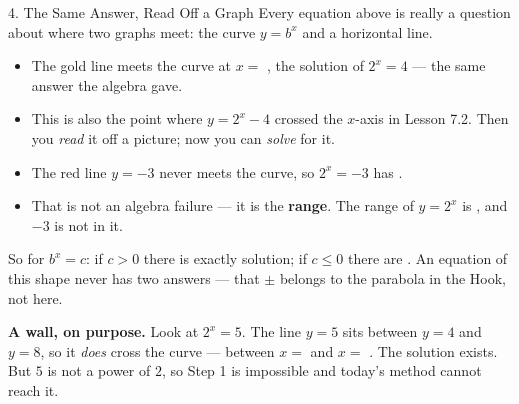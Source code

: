 \documentclass[10pt]{article}
\newcommand{\lgrid}[4]{%
  \draw[step=1, linegray!40, very thin] (#1,#3) grid (#2,#4);
  \draw[->, semithick, charcoal] (#1,0)--(#2,0) node[below right, font=\scriptsize]{$x$};
  \draw[->, semithick, charcoal] (0,#3)--(0,#4) node[left, font=\scriptsize]{$y$};}
\newcommand{\expgraph}[6]{\draw[very thick, forest, domain=#5:#6, samples=140, smooth]
  plot (\x,{(#1)*exp((#2)*((\x)-(#3)))+(#4)});}
\newcommand{\solline}[3]{\draw[goldacc, very thick] (#1,#3)--(#2,#3);}
\begin{document}
\begin{notesbox}{4. The Same Answer, Read Off a Graph}
Every equation above is really a question about where two graphs meet: the curve $y=b^{x}$ and a
horizontal line.
\begin{center}
\begin{minipage}[c]{0.42\linewidth}
\centering
{}
\end{minipage}
\begin{minipage}[c]{0.54\linewidth}
\small
\begin{itemize}[leftmargin=1.3em, itemsep=4pt]
  \item The gold line meets the curve at $x=$ , the solution of $2^{x}=4$ --- the same
        answer the algebra gave.
  \item This is also the point where $y=2^{x}-4$ crossed the $x$-axis in Lesson 7.2. Then you
        \emph{read} it off a picture; now you can \emph{solve} for it.
  \item The red line $y=-3$ never meets the curve, so $2^{x}=-3$ has .
  \item That is not an algebra failure --- it is the \textbf{range}. The range of $y=2^{x}$ is
        , and $-3$ is not in it.
\end{itemize}
\end{minipage}
\end{center}

\vspace{3pt}
So for $b^{x}=c$: if $c>0$ there is exactly  solution; if $c\le0$ there are
. An equation of this shape never has two answers --- that $\pm$ belongs to the parabola
in the Hook, not here.

\vspace{5pt}
\begin{tcolorbox}[colback=sky, colframe=navy, boxrule=0.8pt, arc=1.5mm,
    left=2.5mm, right=2.5mm, top=1.5mm, bottom=1.5mm]
\textbf{A wall, on purpose.} Look at $2^{x}=5$. The line $y=5$ sits between $y=4$ and $y=8$, so it
\emph{does} cross the curve --- between $x=$  and $x=$ . The solution
exists. But $5$ is not a power of $2$, so Step 1 is impossible and today's method cannot reach it.


\end{tcolorbox}
\end{notesbox}
\end{document}
